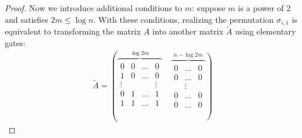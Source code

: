\documentclass[a4paper,UKenglish,cleveref, autoref, thm-restate]{lipics-v2021}
\begin{document}
\begin{proof}
Now we introduce additional conditions to $m$: suppose $m$ is a power of 2 and satisfies $2m \leq \log n$. With these conditions, realizing the permutation $\sigma_{i,1}$ is equivalent to transforming the matrix $A$ into another matrix $\widetilde{A}$ using elementary gates:
\begin{align}
    \widetilde{A} = \left( \overbrace{\begin{matrix}
        0 & 0 & \dots & 0    \\
        1 & 0 & \dots & 0    \\
        \vdots & & & \vdots  \\
        0 & 1 & \dots & 1    \\
        1 & 1 & \dots & 1   \\
    \end{matrix}}^{\log 2m} \right. \quad
    \left. \overbrace{\begin{matrix}
           0 & \dots & 0 \\
           0 & \dots & 0 \\
           & \vdots& \\
           0 & \dots & 0 \\
           0 & \dots & 0 
    \end{matrix}}^{n - \log 2m} \right)
\end{align}


\end{proof}
\end{document}
